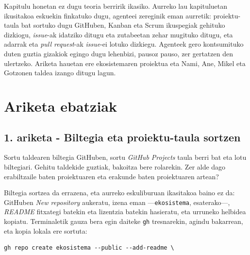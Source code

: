 
Kapitulu honetan ez dugu teoria berririk ikasiko.
Aurreko lau kapituluetan ikusitakoa eskuekin finkatuko dugu, agenteei zereginik eman aurretik: proiektu-taula bat sortuko dugu GitHuben, Kanban eta Scrum ikuspegiak gehituko dizkiogu, \textit{issue}-ak idatziko ditugu eta zutabeetan zehar mugituko ditugu, eta adarrak eta \textit{pull request}-ak \textit{issue}-ei lotuko dizkiegu.
Agenteek gero kontsumituko duten guztia gizakiok egingo dugu lehenbizi, pausoz pauso, zer gertatzen den ulertzeko.
Ariketa hauetan ere ekosistemaren proiektua eta Nami, Ane, Mikel eta Gotzonen taldea izango ditugu lagun.

\section{Ariketa ebatziak}

\subsection{1. ariketa - Biltegia eta proiektu-taula sortzen}

Sortu taldearen biltegia GitHuben, sortu \textit{GitHub Projects} taula berri bat eta lotu biltegiari.
Gehitu taldekide guztiak, bakoitza bere rolarekin.
Zer alde dago erabiltzaile baten proiektuaren eta erakunde baten proiektuaren artean?

Biltegia sortzea da errazena, eta aurreko eskuliburuan ikasitakoa baino ez da: GitHuben \textit{New repository} aukeratu, izena eman ---\verb|ekosistema|, esaterako---, \textit{README} fitxategi batekin eta lizentzia batekin hasieratu, eta urruneko helbidea kopiatu.
Terminaletik gauza bera egin daiteke \verb|gh| tresnarekin, agindu bakarrean, eta kopia lokala ere sortuta:

\verb|gh repo create ekosistema --public --add-readme \|

